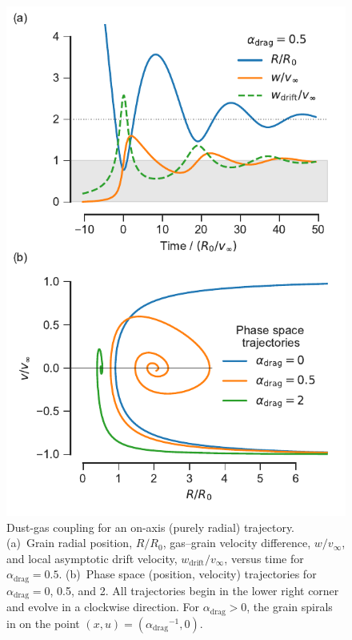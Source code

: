 \newcommand\drag{\ensuremath{_{\text{drag}}}}
\newcommand{\gas}{\ensuremath{_{\text{gas}}}}
\newcommand{\drift}{\ensuremath{_{\text{drift}}}}
\newcommand\soundspeed{\ensuremath{c_{\text{s,gas}}}}


\begin{figure}
  \centering
  \includegraphics[width=\linewidth]{figs/dust-coupling-1d}
  \caption{Dust-gas coupling for an on-axis (purely radial)
    trajectory.  (a)~Grain radial position, \(R/R_0\), gas--grain
    velocity difference, \(w/v_\infty\), and local asymptotic drift
    velocity, \(w\drift/v_\infty\), versus time for
    \(\alpha\drag = 0.5\).  (b)~Phase space (position, velocity)
    trajectories for \(\alpha\drag = 0\), 0.5, and 2. All trajectories
    begin in the lower right corner and evolve in a clockwise
    direction. For \(\alpha\drag > 0\), the grain spirals in on the point
    \((x, u) = (\alpha\drag^{-1}, 0)\).}
  \label{fig:dust-coupling-1d}
\end{figure}

